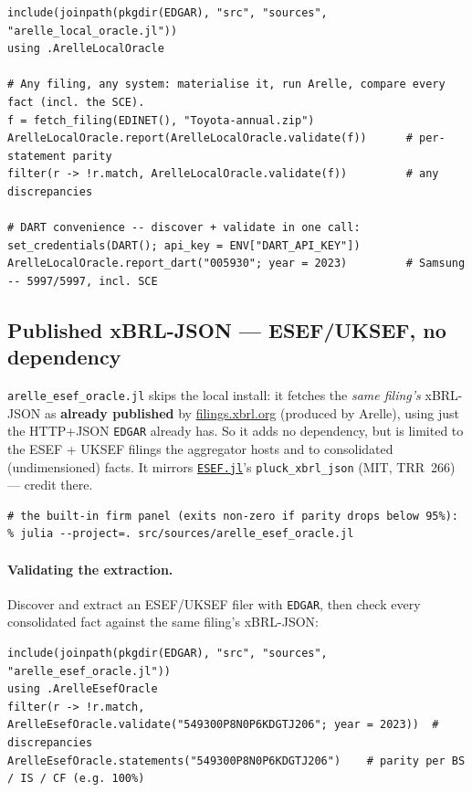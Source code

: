 \documentclass[11pt,a4paper]{report}
\begin{document}
\begin{lstlisting}
include(joinpath(pkgdir(EDGAR), "src", "sources", "arelle_local_oracle.jl"))
using .ArelleLocalOracle

# Any filing, any system: materialise it, run Arelle, compare every fact (incl. the SCE).
f = fetch_filing(EDINET(), "Toyota-annual.zip")
ArelleLocalOracle.report(ArelleLocalOracle.validate(f))      # per-statement parity
filter(r -> !r.match, ArelleLocalOracle.validate(f))         # any discrepancies

# DART convenience -- discover + validate in one call:
set_credentials(DART(); api_key = ENV["DART_API_KEY"])
ArelleLocalOracle.report_dart("005930"; year = 2023)         # Samsung -- 5997/5997, incl. SCE
\end{lstlisting}

\subsection{Published xBRL-JSON --- ESEF/UKSEF, no dependency}

\texttt{arelle\_esef\_oracle.jl} skips the local install: it fetches the \emph{same filing's} xBRL-JSON as
\textbf{already published} by \href{https://filings.xbrl.org}{filings.xbrl.org} (produced by Arelle), using
just the HTTP+JSON \texttt{EDGAR} already has. So it adds no dependency, but is limited to the ESEF + UKSEF
filings the aggregator hosts and to consolidated (undimensioned) facts. It mirrors
\href{https://github.com/trr266/ESEF.jl}{\texttt{ESEF.jl}}'s \texttt{pluck\_xbrl\_json} (MIT, TRR~266) ---
credit there.

\begin{lstlisting}[style=term]
# the built-in firm panel (exits non-zero if parity drops below 95%):
% julia --project=. src/sources/arelle_esef_oracle.jl
\end{lstlisting}

\paragraph{Validating the extraction.} Discover and extract an ESEF/UKSEF filer with \texttt{EDGAR}, then
check every consolidated fact against the same filing's xBRL-JSON:

\begin{lstlisting}
include(joinpath(pkgdir(EDGAR), "src", "sources", "arelle_esef_oracle.jl"))
using .ArelleEsefOracle
filter(r -> !r.match, ArelleEsefOracle.validate("549300P8N0P6KDGTJ206"; year = 2023))  # discrepancies
ArelleEsefOracle.statements("549300P8N0P6KDGTJ206")    # parity per BS / IS / CF (e.g. 100%)
\end{lstlisting}
\end{document}
